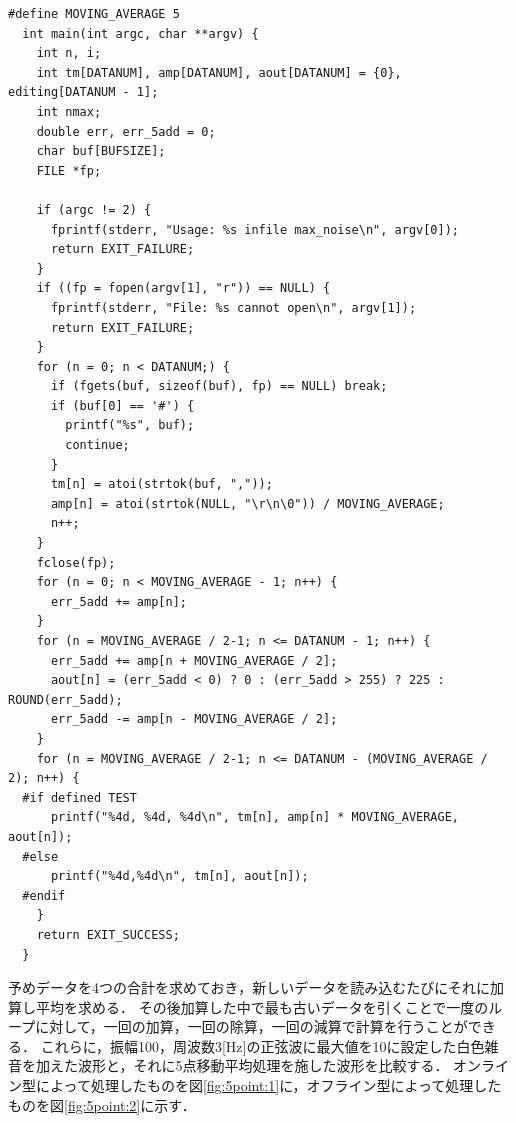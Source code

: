 \documentclass[titlepage]{jarticle}
\begin{document}
\begin{lstlisting}[caption=mvave5-2.c,label=5point:2]
  #define MOVING_AVERAGE 5
  int main(int argc, char **argv) {
    int n, i;
    int tm[DATANUM], amp[DATANUM], aout[DATANUM] = {0}, editing[DATANUM - 1];
    int nmax;
    double err, err_5add = 0;
    char buf[BUFSIZE];
    FILE *fp;
  
    if (argc != 2) {
      fprintf(stderr, "Usage: %s infile max_noise\n", argv[0]);
      return EXIT_FAILURE;
    }
    if ((fp = fopen(argv[1], "r")) == NULL) {
      fprintf(stderr, "File: %s cannot open\n", argv[1]);
      return EXIT_FAILURE;
    }
    for (n = 0; n < DATANUM;) {
      if (fgets(buf, sizeof(buf), fp) == NULL) break;
      if (buf[0] == '#') {
        printf("%s", buf);
        continue;
      }
      tm[n] = atoi(strtok(buf, ","));
      amp[n] = atoi(strtok(NULL, "\r\n\0")) / MOVING_AVERAGE;
      n++;
    }
    fclose(fp);
    for (n = 0; n < MOVING_AVERAGE - 1; n++) {
      err_5add += amp[n];
    }
    for (n = MOVING_AVERAGE / 2-1; n <= DATANUM - 1; n++) {
      err_5add += amp[n + MOVING_AVERAGE / 2];
      aout[n] = (err_5add < 0) ? 0 : (err_5add > 255) ? 225 : ROUND(err_5add);
      err_5add -= amp[n - MOVING_AVERAGE / 2];
    }
    for (n = MOVING_AVERAGE / 2-1; n <= DATANUM - (MOVING_AVERAGE / 2); n++) {
  #if defined TEST
      printf("%4d, %4d, %4d\n", tm[n], amp[n] * MOVING_AVERAGE, aout[n]);
  #else
      printf("%4d,%4d\n", tm[n], aout[n]);
  #endif
    }
    return EXIT_SUCCESS;
  }
\end{lstlisting}
予めデータを4つの合計を求めておき，新しいデータを読み込むたびにそれに加算し平均を求める．
その後加算した中で最も古いデータを引くことで一度のループに対して，一回の加算，一回の除算，一回の減算で計算を行うことができる．
これらに，振幅100，周波数3[Hz]の正弦波に最大値を10に設定した白色雑音を加えた波形と，それに5点移動平均処理を施した波形を比較する．
オンライン型によって処理したものを図\ref{fig:5point:1}に，オフライン型によって処理したものを図\ref{fig:5point:2}に示す．
\end{document}
